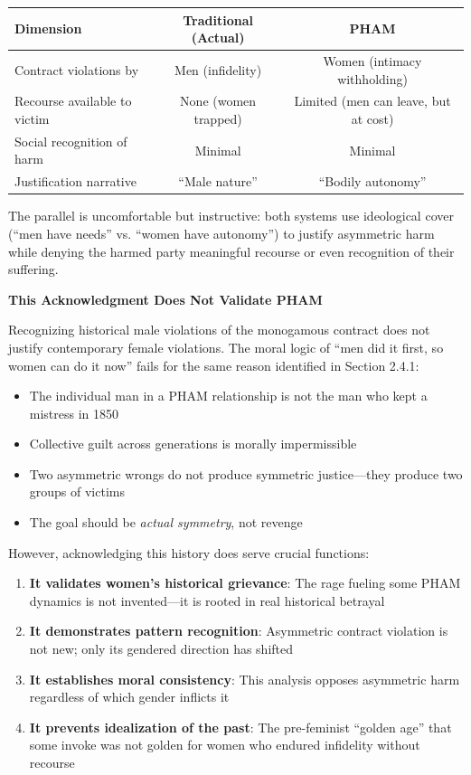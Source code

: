 \documentclass[12pt,openany]{book}
\numberwithin{equation}{chapter}
\begin{document}
\begin{center}
\begin{tabular}{|l|c|c|}
\hline
\textbf{Dimension} & \textbf{Traditional (Actual)} & \textbf{PHAM} \\
\hline
Contract violations by & Men (infidelity) & Women (intimacy withholding) \\
Recourse available to victim & None (women trapped) & Limited (men can leave, but at cost) \\
Social recognition of harm & Minimal & Minimal \\
Justification narrative & ``Male nature'' & ``Bodily autonomy'' \\
\hline
\end{tabular}
\end{center}

The parallel is uncomfortable but instructive: both systems use ideological cover (``men have needs'' vs. ``women have autonomy'') to justify asymmetric harm while denying the harmed party meaningful recourse or even recognition of their suffering.

\textbf{This Acknowledgment Does Not Validate PHAM}

Recognizing historical male violations of the monogamous contract does not justify contemporary female violations. The moral logic of ``men did it first, so women can do it now'' fails for the same reason identified in Section 2.4.1:

\begin{itemize}
    \item The individual man in a PHAM relationship is not the man who kept a mistress in 1850
    \item Collective guilt across generations is morally impermissible
    \item Two asymmetric wrongs do not produce symmetric justice---they produce two groups of victims
    \item The goal should be \textit{actual symmetry}, not revenge
\end{itemize}

However, acknowledging this history does serve crucial functions:

\begin{enumerate}
    \item \textbf{It validates women's historical grievance}: The rage fueling some PHAM dynamics is not invented---it is rooted in real historical betrayal
    \item \textbf{It demonstrates pattern recognition}: Asymmetric contract violation is not new; only its gendered direction has shifted
    \item \textbf{It establishes moral consistency}: This analysis opposes asymmetric harm regardless of which gender inflicts it
    \item \textbf{It prevents idealization of the past}: The pre-feminist ``golden age'' that some invoke was not golden for women who endured infidelity without recourse
\end{enumerate}
\end{document}
